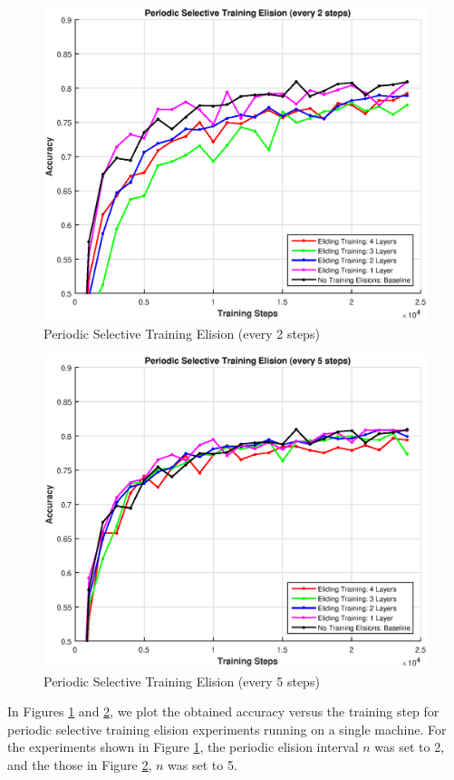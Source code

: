 \begin{figure}[t]
	\centering
	\includegraphics[width=0.8\columnwidth]{figures/periodic-approx-2.eps}
	\caption{Periodic Selective Training Elision (every 2 steps)}
	\label{fig:periodic-approx-2}
\end{figure}
\begin{figure}[t]
	\centering
	\includegraphics[width=0.8\columnwidth]{figures/periodic-approx-5.eps}
	\caption{Periodic Selective Training Elision (every 5 steps)}
	\label{fig:periodic-approx-5}
\end{figure}

In Figures \ref{fig:periodic-approx-2} and \ref{fig:periodic-approx-5}, we plot the obtained accuracy versus the training step for periodic selective training elision experiments running on a single machine. For the experiments shown in Figure \ref{fig:periodic-approx-2}, the periodic elision interval $n$ was set to 2, and the those in Figure \ref{fig:periodic-approx-5}, $n$ was set to 5. 


